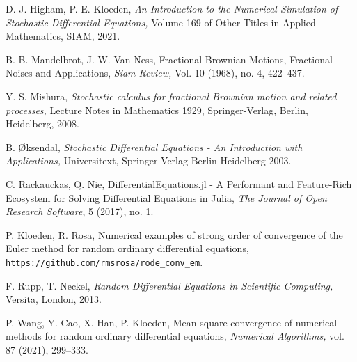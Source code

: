 \documentclass[reqno,12pt]{amsart}
\theoremstyle{plain}%
\theoremstyle{definition}
\begin{document}
\begin{thebibliography}{25}
     D. J. Higham, P. E. Kloeden, \emph{An Introduction to the Numerical Simulation of Stochastic Differential Equations,} Volume 169 of Other Titles in Applied Mathematics, SIAM, 2021.

     B. B. Mandelbrot, J. W. Van Ness, Fractional Brownian Motions, Fractional Noises and Applications, \emph{Siam Review,} Vol. 10 (1968), no. 4, 422--437.

     Y. S. Mishura, \emph{Stochastic calculus for fractional Brownian motion and related processes,} Lecture Notes in Mathematics 1929, Springer-Verlag, Berlin, Heidelberg, 2008.

     B. {\O}ksendal, \emph{Stochastic Differential Equations - An Introduction with Applications,} Universitext, Springer-Verlag Berlin Heidelberg 2003.

     C. Rackauckas, Q. Nie, DifferentialEquations.jl - A Performant and Feature-Rich Ecosystem for Solving Differential Equations in Julia, \emph{The Journal of Open Research Software}, 5 (2017), no. 1.

     P. Kloeden, R. Rosa, Numerical examples of strong order of convergence of the Euler method for random ordinary differential equations, \texttt{https://github.com/rmsrosa/rode\_conv\_em}.

     F. Rupp, T. Neckel, \emph{Random Differential Equations in Scientific Computing,} Versita, London, 2013.

     P. Wang, Y. Cao, X. Han, P. Kloeden, Mean-square convergence of numerical methods for random ordinary differential equations, \emph{Numerical Algorithms,} vol. 87 (2021), 299--333.

\end{thebibliography}
\end{document}
